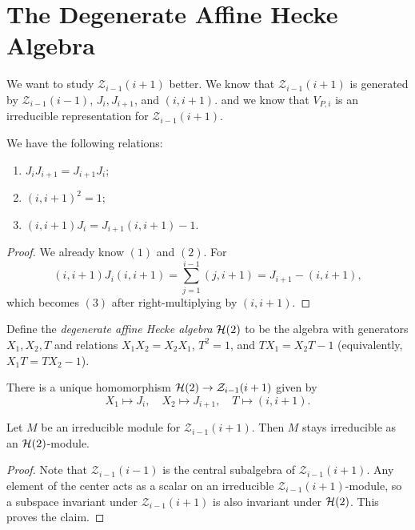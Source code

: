 \section{The Degenerate Affine Hecke Algebra}

\begin{remark}
  We want to study $\mathcal{Z}_{i - 1}(i + 1)$
  better.
  We know that $\mathcal{Z}_{i - 1}(i + 1)$
  is generated by
  $\mathcal{Z}_{i - 1}(i - 1)$, $J_i, J_{i + 1}$, and
  $(i, i + 1)$.
  and we know that 
  $V_{P, i}$ is an irreducible representation
  for $\mathcal{Z}_{i - 1}(i + 1)$.
\end{remark}

\begin{lemma}
  We have the following relations:
  \begin{enumerate}
    \item $J_i J_{i + 1} = J_{i + 1} J_i$;
    \item $(i, i + 1)^2 = 1$;
    \item $(i, i + 1) J_i = J_{i + 1} (i, i + 1) - 1$.
  \end{enumerate}
\end{lemma}

\begin{proof}
  We already know $(1)$ and $(2)$. For
  \[
    (i, i + 1) J_i (i, i + 1)
    = \sum_{j = 1}^{i - 1} (j, i + 1)
    = J_{i + 1} - (i, i + 1),
  \]
  which becomes $(3)$ after right-multiplying
  by $(i, i + 1)$.
\end{proof}

\begin{definition}
  Define the \emph{degenerate affine Hecke algebra}
  $\mathcal{H}(2)$ to be the algebra
  with generators $X_1, X_2, T$ and relations
  $X_1 X_2 = X_2 X_1$,
  $T^2 = 1$, and
  $T X_1 = X_2 T - 1$ (equivalently,
  $X_1 T = T X_2 - 1$).
\end{definition}

\begin{remark}
  There is a unique homomorphism
  $\mathcal{H}(2) \to \mathcal{Z}_{i - 1}(i + 1)$
  given by
  \[
    X_1 \mapsto J_i, \quad
    X_2 \mapsto J_{i + 1}, \quad
    T \mapsto (i, i + 1).
  \]
\end{remark}

\begin{corollary}
  Let $M$ be an irreducible module
  for $\mathcal{Z}_{i - 1}(i + 1)$.
  Then $M$ stays irreducible as an
  $\mathcal{H}(2)$-module.
\end{corollary}

\begin{proof}
  Note that $\mathcal{Z}_{i - 1}(i - 1)$
  is the central subalgebra of
  $\mathcal{Z}_{i - 1}(i + 1)$. Any element
  of the center acts as a scalar
  on an irreducible $\mathcal{Z}_{i - 1}(i + 1)$-module,
  so a subspace invariant under
  $\mathcal{Z}_{i - 1}(i + 1)$ is
  also invariant under $\mathcal{H}(2)$. This
  proves the claim.
\end{proof}

